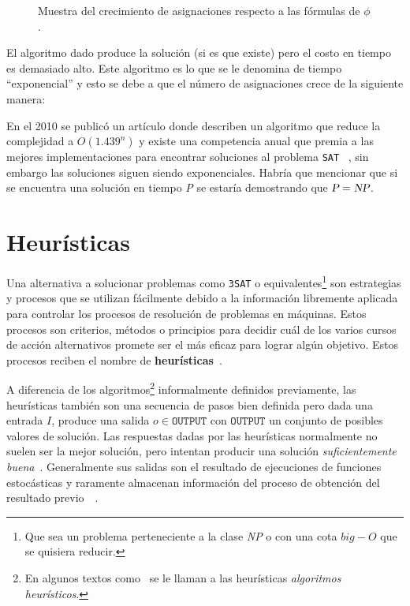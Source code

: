 \begin{figure}[h]

\caption[short caption]{Muestra del crecimiento de asignaciones respecto a las fórmulas de $\phi$.}
\label{fig:satfigure}
\end{figure} 


El algoritmo dado produce la solución (si es que existe) pero el costo en tiempo
es demasiado alto. Este algoritmo es lo que se le denomina de tiempo ``exponencial'' y
esto se debe a que el número de asignaciones crece de la siguiente manera:



En el 2010 se publicó un artículo donde describen un algoritmo que reduce la
complejidad a $O(1.439^{n})$ y existe una competencia anual que premia a las
mejores implementaciones para encontrar soluciones al problema
\texttt{SAT}~\cite{Kutzkov2010} \cite{satcompetition}, sin embargo las
soluciones siguen siendo exponenciales.  Habría que mencionar que si se
encuentra una solución en tiempo \textsl{P} se estaría demostrando que
$\textsl{P}=\textsl{NP}$.

\section{Heurísticas}

Una alternativa a solucionar problemas como \texttt{3SAT} o
equivalentes\footnote{Que sea un problema perteneciente a la clase \textsl{NP} o
  con una cota \textit{$big-O$} que se quisiera reducir.} son estrategias y procesos
que se utilizan fácilmente debido a la información libremente aplicada para
controlar los procesos de resolución de problemas en máquinas. Estos procesos
son criterios, métodos o principios para decidir cuál de los varios cursos de
acción alternativos promete ser el más eficaz para lograr algún objetivo. Estos
procesos reciben el nombre de \textbf{heurísticas}~\cite{Pearl1984}.

A diferencia de los algoritmos\footnote{En algunos textos
  como~\cite{DeInformatica2010} se le llaman a las heurísticas
  \textit{algoritmos heurísticos}.} informalmente definidos previamente, las
heurísticas también son una secuencia de pasos bien definida pero dada una
entrada $I$, produce una salida $o \in \texttt{OUTPUT}$ con $\texttt{OUTPUT}$ un
conjunto de posibles valores de solución.  Las respuestas dadas por las
heurísticas normalmente no suelen ser la mejor solución, pero intentan producir
una solución \emph{suficientemente buena}~\cite{Gigerenzer2008}.  Generalmente
sus salidas son el resultado de ejecuciones de funciones estocásticas y
raramente almacenan información del proceso de obtención del resultado
previo~\cite{heuristicdefoxford}~\cite{Pearl1984}.

